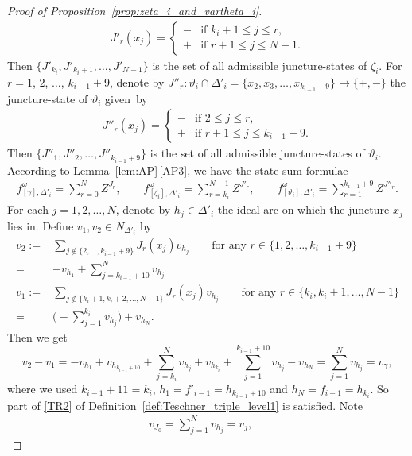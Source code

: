\documentclass[pdftex]{sigma}
\numberwithin{equation}{section}
\theoremstyle{definition}
\begin{document}
\begin{proof}[Proof of Proposition~\ref{prop:zeta_i_and_vartheta_i}]
\begin{align*}
J'_r(x_j) = \begin{cases}
- & \mbox{if $k_i +1 \le j \le r$}, \\
+ & \mbox{if $r+1 \le j \le N-1$}.
\end{cases}
\end{align*}
Then $\{J'_{k_i}, J'_{k_i+1},\dots,J'_{N-1}\}$ is the set of all admissible juncture-states of $\zeta_i$. For $r=1$, $2$, $\dots$, $k_{i-1}+9$, denote by $J''_r \colon \vartheta_i \cap \Delta'_i = \{x_2,x_3,\dots,x_{k_{i-1}+9}\} \to \{+,-\}$ the juncture-state of $\vartheta_i$ given~by
\begin{align*}
J''_r(x_j) = \begin{cases}
- & \mbox{if $2 \le j \le r$}, \\
+ & \mbox{if $r+1 \le j \le k_{i-1}+9$}.
\end{cases}
\end{align*}
Then $\{J''_1,J''_2,\dots,J''_{k_{i-1}+9}\}$ is the set of all admissible juncture-states of $\vartheta_i$. According to Lem\-ma~\ref{lem:AP}\,\ref{AP3}, we have the state-sum formulae
\begin{align*}
f^\omega_{[\gamma],\Delta'_i} = \sum_{r=0}^{N} Z^{J_r}, \qquad
f^\omega_{[\zeta_i],\Delta'_i} = \sum_{r=k_i}^{N-1} Z^{J'_r}, \qquad
f^\omega_{[\vartheta_i],\Delta'_i} = \sum_{r=1}^{k_{i-1}+9} Z^{J''_r}.
\end{align*}
For each $j=1,2,\dots,N$, denote by $h_j \in \Delta'_i$ the ideal arc on which the juncture $x_j$ lies in. Define $v_1,v_2 \in N_{\Delta'_i}$ by
\begin{align*}
v_2 :={}& \sum_{j \notin \{2,\dots,k_{i-1}+9\}} J_r(x_j) v_{h_j} \qquad \mbox{for any $r\in\{1,2,\dots,k_{i-1}+9\}$} \\
={}& -v_{h_1} + \sum_{j=k_{i-1}+10}^{N} v_{h_j} \\
v_1 :={}& \sum_{j \notin \{k_i+1,k_i+2,\dots,N-1\}} J_r(x_j) v_{h_j} \qquad \mbox{for any $r\in \{k_i,k_i+1,\dots,N-1\}$} \\
={} & \biggl( - \sum_{j=1}^{k_i} v_{h_j} \biggr) + v_{h_N}.
\end{align*}
Then we get
\[
v_2 - v_1 = -v_{h_1} + v_{h_{k_{i-1}+10}} + \sum_{j=k_i}^{N} v_{h_j} + v_{h_{k_i}} + \sum_{j=1}^{k_{i-1}+10} v_{h_j} -v_{h_N}
= \sum_{j=1}^{N} v_{h_j} = v_\gamma,
\]
where we used $k_{i-1}+11= k_i$, $h_1 = f'_{i-1}=h_{k_{i-1}+10}$ and $h_N = f_{i-1} = h_{k_i}$. So part of \ref{TR2} of Definition~\ref{def:Teschner_triple_level1} is satisfied. Note
\begin{align*}
&v_{J_0} = \sum_{j=1}^{N} v_{h_j} = v_j, \qquad

\end{align*}
\end{proof}
\end{document}

